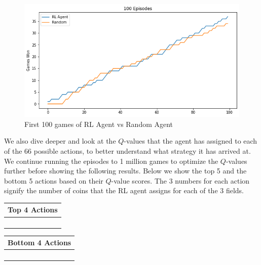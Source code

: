 \documentclass[11pt, oneside]{article}   	%
\begin{document}
\begin{figure}[h]
    \centering
    \includegraphics[scale=0.5]{./images/rl_random100.png}
    \caption{First 100 games of RL Agent vs Random Agent}
    \label{fig:mesh1}
\end{figure}

We also dive deeper and look at the $Q$-values that the agent has assigned to each of the 66 possible actions, to better understand what strategy it has arrived at. We continue running the episodes to 1 million games to optimize the $Q$-values further before showing the following results. Below we show the top 5 and the bottom 5 actions based on their $Q$-value scores. The 3 numbers for each action signify the number of coins that the RL agent assigns for each of the 3 fields.

\hfill

\begin{center}
\begin{tabular}{ |c| } 
 \hline
 \textbf{Top 4 Actions} \\ 
 \hline
 [4, 0, 6] \\ 
 \hline
 [5, 0, 5] \\ 
 \hline
 [0, 4, 6] \\
 \hline
 [6, 1, 3] \\

 \hline
\end{tabular}
\quad
\begin{tabular}{ |c| } 
 \hline
\textbf{Bottom 4 Actions} \\ 
 \hline
 [0, 0, 10] \\ 
 \hline
[0, 8, 2] \\
 \hline
 [0, 10, 0] \\
 \hline
 [10, 0, 0] \\
 \hline
\end{tabular}
\end{center}
\end{document}
